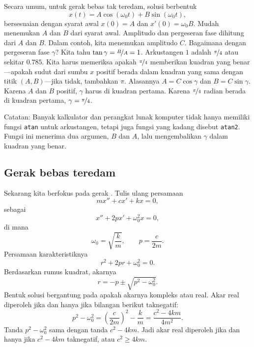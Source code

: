 Secara umum, untuk gerak bebas tak teredam, solusi berbentuk
\begin{equation*}
x(t) = A \cos (\omega_0 t) + B \sin (\omega_0 t) ,
\end{equation*}
bersesuaian dengan syarat awal $x(0) = A$ dan $x'(0) = \omega_0 B$. Mudah menemukan $A$ dan $B$ dari syarat awal. Amplitudo dan pergeseran fase dihitung dari $A$ dan $B$. Dalam contoh, kita menemukan amplitudo $C$. Bagaimana dengan pergeseran fase $\gamma$? Kita tahu $\tan \gamma = \nicefrac{B}{A} = 1$. Arkustangen $1$ adalah $\nicefrac{\pi}{4}$ atau sekitar $0.785$. Kita harus memeriksa apakah $\nicefrac{\pi}{4}$ memberikan kuadran yang benar---apakah sudut dari sumbu $x$ positif berada dalam kuadran yang sama dengan titik $(A,B)$---jika tidak, tambahkan $\pi$. Alasannya $A = C \cos \gamma$ dan $B = C \sin \gamma$. Karena $A$ dan $B$ positif, $\gamma$ harus di kuadran pertama. Karena $\nicefrac{\pi}{4}$ radian berada di kuadran pertama, $\gamma = \nicefrac{\pi}{4}$.

Catatan: Banyak kalkulator dan perangkat lunak komputer tidak hanya memiliki fungsi \texttt{atan} untuk arkustangen, tetapi juga fungsi yang kadang disebut \texttt{atan2}. Fungsi ini menerima dua argumen, $B$ dan $A$, lalu mengembalikan $\gamma$ dalam kuadran yang benar.

\subsection{Gerak bebas teredam}


Sekarang kita berfokus pada gerak . Tulis ulang persamaan
\begin{equation*}
m x'' + c x' + kx = 0,
\end{equation*}
sebagai
\begin{equation*}
x'' + 2p x' + \omega_0^2 x = 0,
\end{equation*}
di mana
\begin{equation*}
\omega_0 = \sqrt{\frac{k}{m}}, \qquad p = \frac{c}{2m} .
\end{equation*}
Persamaan karakteristiknya
\begin{equation*}
r^2 + 2 pr + \omega_0^2 = 0 .
\end{equation*}
Berdasarkan rumus kuadrat, akarnya
\begin{equation*}
r = -p \pm \sqrt{p^2 - \omega_0^2} .
\end{equation*}
Bentuk solusi bergantung pada apakah akarnya kompleks atau real. Akar real diperoleh jika dan hanya jika bilangan berikut taknegatif:
\begin{equation*}
p^2 - \omega_0^2 = {\left( \frac{c}{2m} \right)}^2 - \frac{k}{m}
= \frac{c^2 - 4km}{4m^2} .
\end{equation*}
Tanda $p^2-\omega_0^2$ sama dengan tanda $c^2 - 4km$. Jadi akar real diperoleh jika dan hanya jika $c^2-4km$ taknegatif, atau $c^2 \geq 4km$.

